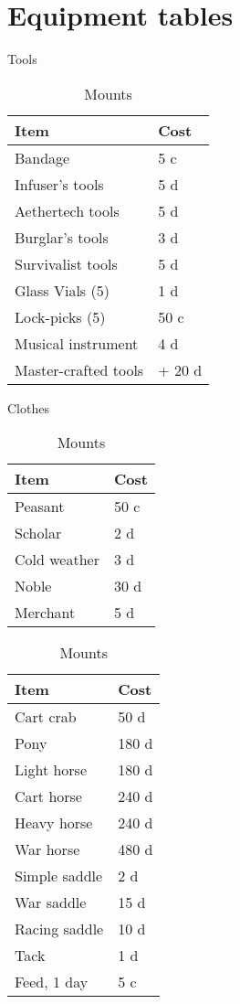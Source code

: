 \documentclass[a4paper,11pt,oneside]{book}
\begin{document}
\chapter{Equipment tables}
\begin{table}[ht]
	\parbox{0.45\hsize}{
	\centering
	\caption{Tools}
	\label{tab:tools}
	\begin{tabular}{|l|l|}
		\hline
		Item & Cost\\ [0.5ex]
		\hline
		Bandage & 5 c\\
		Infuser's tools & 5 d\\
		Aethertech tools & 5 d \\
		Burglar's tools & 3 d \\
		Survivalist tools & 5 d \\
		Glass Vials (5)& 1 d\\
		Lock-picks (5) & 50 c\\
		Musical instrument & 4 d\\		
		\hline
		Master-crafted tools & + 20 d\\
		\hline
	\end{tabular}}
	\parbox{0.45\hsize}{
	\centering
	\caption{Clothes}
	\begin{tabular}{|l|l|}
		\hline
		Item & Cost\\ [0.5ex]
		\hline
		Peasant & 50 c\\
		Scholar & 2 d\\
		Cold weather & 3 d\\
		Noble & 30 d\\
		Merchant & 5 d\\
		\hline
	\end{tabular}}

	\centering
	\caption{Mounts}
	\begin{tabular}{|l|l|}
		\hline
		Item & Cost\\ [0.5ex]
		\hline
		Cart crab & 50 d \\ 
		Pony & 180 d\\
		Light horse & 180 d\\
		Cart horse & 240 d\\
		Heavy horse & 240 d\\
		War horse & 480 d\\
		\hline
		Simple saddle & 2 d\\
		War saddle & 15 d\\
		Racing saddle & 10 d\\
		Tack & 1 d\\
		Feed, 1 day & 5 c\\
		\hline
	\end{tabular}
\end{table}
\end{document}
